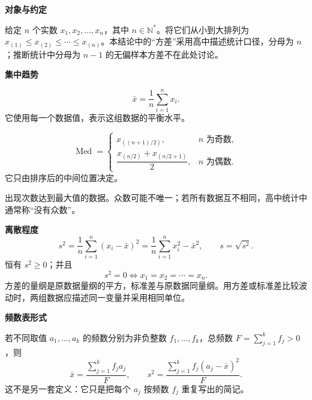 \begin{statementbox}

	\textbf{\textcolor{CStatement}{对象与约定}}

	给定 $n$ 个实数 $x_1,x_2,\dots,x_n$，其中 $n\in\mathbb N^*$。将它们从小到大排列为
	$x_{(1)}\le x_{(2)}\le\cdots\le x_{(n)}$。本结论中的“方差”采用高中描述统计口径，分母为 $n$；推断统计中分母为 $n-1$ 的无偏样本方差不在此处讨论。

	\medskip
	\textbf{\textcolor{CStatement}{集中趋势}}
	\begin{description}[style=nextline,leftmargin=2.8em,labelsep=0.5em,itemsep=0.45em]
		\item[\textbf{平均数}]
			\[
				\bar x=\frac1n\sum_{i=1}^{n}x_i.
			\]
			它使用每一个数据值，表示这组数据的平衡水平。

		\item[\textbf{中位数}]
			\[
				\operatorname{Med}=\begin{cases}
					x_{((n+1)/2)},&n\text{ 为奇数},\\[3pt]
					\dfrac{x_{(n/2)}+x_{(n/2+1)}}2,&n\text{ 为偶数}.
				\end{cases}
			\]
			它只由排序后的中间位置决定。

		\item[\textbf{众数}]
			出现次数达到最大值的数据。众数可能不唯一；若所有数据互不相同，高中统计中通常称“没有众数”。
	\end{description}

	\medskip
	\textbf{\textcolor{CStatement}{离散程度}}
	\[
		s^2=\frac1n\sum_{i=1}^{n}(x_i-\bar x)^2
		=\frac1n\sum_{i=1}^{n}x_i^2-\bar x^2,
		\qquad s=\sqrt{s^2}.
	\]
	恒有 $s^2\ge0$；并且
	\[
		s^2=0\iff x_1=x_2=\cdots=x_n.
	\]
	方差的量纲是原数据量纲的平方，标准差与原数据同量纲。用方差或标准差比较波动时，两组数据应描述同一变量并采用相同单位。

	\medskip
	\textbf{\textcolor{CStatement}{频数表形式}}

	若不同取值 $a_1,\dots,a_k$ 的频数分别为非负整数 $f_1,\dots,f_k$，总频数 $F=\sum_{j=1}^{k}f_j>0$，则
	\[
		\bar x=\frac{\sum_{j=1}^{k}f_ja_j}{F},
		\qquad
		s^2=\frac{\sum_{j=1}^{k}f_j(a_j-\bar x)^2}{F}.
	\]
	这不是另一套定义：它只是把每个 $a_j$ 按频数 $f_j$ 重复写出的简记。

\end{statementbox}
